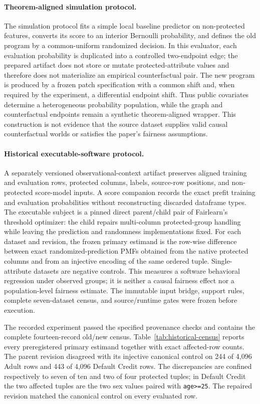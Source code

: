 \paragraph{Theorem-aligned simulation protocol.}
The simulation protocol fits a simple local baseline predictor on non-protected
features, converts its score to an interior Bernoulli probability, and defines
the old program by a common-uniform randomized decision. In this evaluator,
each evaluation probability is duplicated into a controlled two-endpoint edge;
the prepared artifact does not store or mutate protected-attribute values and
therefore does not materialize an empirical counterfactual pair. The new program
is produced by a frozen patch specification with a common shift and, when
required by the experiment, a differential endpoint shift. Thus public
covariates determine a heterogeneous probability population, while the graph
and counterfactual endpoints remain a synthetic theorem-aligned wrapper. This
construction is not evidence that the source dataset supplies valid causal
counterfactual worlds or satisfies the paper's fairness assumptions.

\paragraph{Historical executable-software protocol.}
A separately versioned observational-context artifact preserves aligned
training and evaluation rows, protected columns, labels, source-row positions,
and non-protected score-model inputs. A score companion records the exact
prefit training and evaluation probabilities without reconstructing discarded
dataframe types. The executable subject is a pinned direct parent/child pair of
Fairlearn's threshold optimizer: the child repairs multi-column protected-group
handling while leaving the prediction and randomness implementations fixed.
For each dataset and revision, the frozen primary estimand is the row-wise
difference between exact randomized-prediction PMFs obtained from the native
protected columns and from an injective encoding of the same ordered tuple.
Single-attribute datasets are negative controls. This measures a software
behavioral regression under observed groups; it is neither a causal fairness
effect nor a population-level fairness estimate. The immutable input bridge,
support rules, complete seven-dataset census, and source/runtime gates were
frozen before execution.

The recorded experiment passed the specified provenance checks and contains the
complete fourteen-record old/new census.  Table~\ref{tab:historical-census}
reports every preregistered primary estimand together with exact affected-row
counts.  The parent revision disagreed with its injective canonical control on
244 of 4,096 Adult rows and 443 of 4,096 Default Credit rows.  The discrepancies
are confined respectively to seven of ten and two of four protected tuples; in
Default Credit the two affected tuples are the two sex values paired with
\texttt{age>=25}.  The repaired revision matched the canonical control on every
evaluated row.

